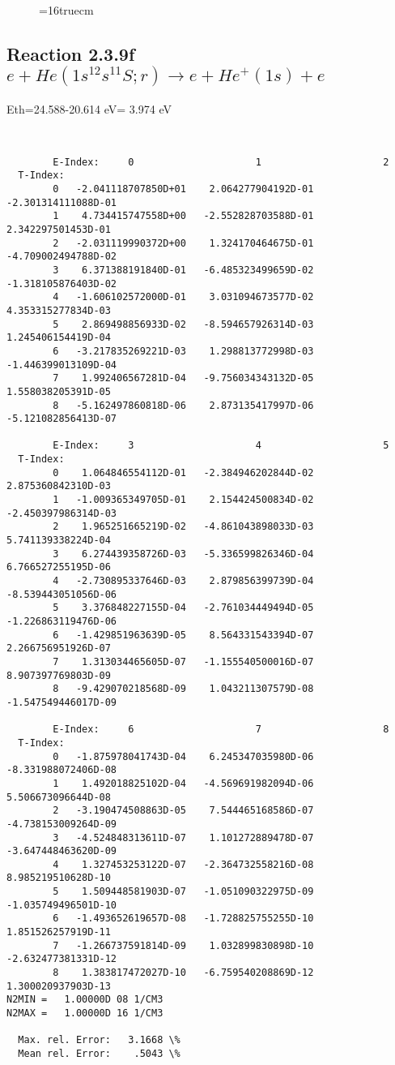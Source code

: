 \documentclass[12pt,dvipdfmx]{article}
\begin{document}
\begin{figure} \label{2.3.9e}
\epsfxsize=16truecm
\end{figure}
\newpage

\subsection{
Reaction 2.3.9f  $e + He(1s^12s^11S;r) \rightarrow e + He^+(1s) + e  $
}
Eth=24.588-20.614 eV= 3.974 eV


\begin{small}\begin{verbatim}


        E-Index:     0                     1                     2
  T-Index:
        0   -2.041118707850D+01    2.064277904192D-01   -2.301314111088D-01
        1    4.734415747558D+00   -2.552828703588D-01    2.342297501453D-01
        2   -2.031119990372D+00    1.324170464675D-01   -4.709002494788D-02
        3    6.371388191840D-01   -6.485323499659D-02   -1.318105876403D-02
        4   -1.606102572000D-01    3.031094673577D-02    4.353315277834D-03
        5    2.869498856933D-02   -8.594657926314D-03    1.245406154419D-04
        6   -3.217835269221D-03    1.298813772998D-03   -1.446399013109D-04
        7    1.992406567281D-04   -9.756034343132D-05    1.558038205391D-05
        8   -5.162497860818D-06    2.873135417997D-06   -5.121082856413D-07

        E-Index:     3                     4                     5
  T-Index:
        0    1.064846554112D-01   -2.384946202844D-02    2.875360842310D-03
        1   -1.009365349705D-01    2.154424500834D-02   -2.450397986314D-03
        2    1.965251665219D-02   -4.861043898033D-03    5.741139338224D-04
        3    6.274439358726D-03   -5.336599826346D-04    6.766527255195D-06
        4   -2.730895337646D-03    2.879856399739D-04   -8.539443051056D-06
        5    3.376848227155D-04   -2.761034449494D-05   -1.226863119476D-06
        6   -1.429851963639D-05    8.564331543394D-07    2.266756951926D-07
        7    1.313034465605D-07   -1.155540500016D-07    8.907397769803D-09
        8   -9.429070218568D-09    1.043211307579D-08   -1.547549446017D-09

        E-Index:     6                     7                     8
  T-Index:
        0   -1.875978041743D-04    6.245347035980D-06   -8.331988072406D-08
        1    1.492018825102D-04   -4.569691982094D-06    5.506673096644D-08
        2   -3.190474508863D-05    7.544465168586D-07   -4.738153009264D-09
        3   -4.524848313611D-07    1.101272889478D-07   -3.647448463620D-09
        4    1.327453253122D-07   -2.364732558216D-08    8.985219510628D-10
        5    1.509448581903D-07   -1.051090322975D-09   -1.035749496501D-10
        6   -1.493652619657D-08   -1.728825755255D-10    1.851526257919D-11
        7   -1.266737591814D-09    1.032899830898D-10   -2.632477381331D-12
        8    1.383817472027D-10   -6.759540208869D-12    1.300020937903D-13
N2MIN =   1.00000D 08 1/CM3
N2MAX =   1.00000D 16 1/CM3

  Max. rel. Error:   3.1668 \%
  Mean rel. Error:    .5043 \%


\end{verbatim}\end{small}
\end{document}
